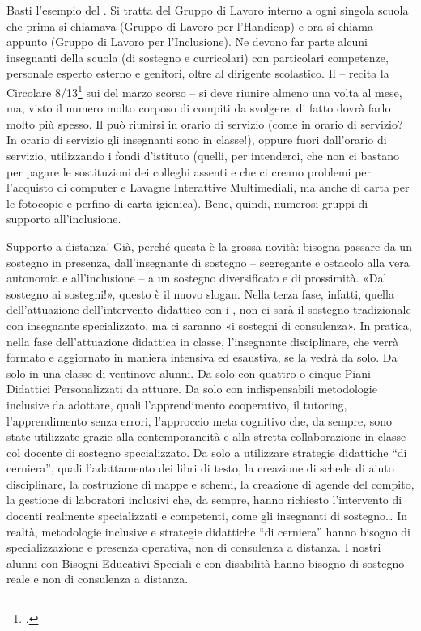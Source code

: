 Basti l'esempio del . Si tratta del Gruppo di Lavoro interno a ogni singola scuola che prima si chiamava  (Gruppo di Lavoro per l'Handicap) e ora si chiama appunto  (Gruppo di Lavoro per l'Inclusione). Ne devono far parte alcuni insegnanti della scuola (di sostegno e curricolari) con particolari competenze, personale esperto esterno e genitori, oltre al dirigente scolastico. Il  – recita la Circolare 8/13\footcite{cm8_2013} sui  del marzo scorso – si deve riunire almeno una volta al mese, ma, visto il numero molto corposo di compiti da svolgere, di fatto dovrà farlo molto più spesso. Il  può riunirsi in orario di servizio (come in orario di servizio? In orario di servizio gli insegnanti sono in classe!), oppure fuori dall'orario di servizio, utilizzando i fondi d'istituto (quelli, per intenderci, che non ci bastano per pagare le sostituzioni dei colleghi assenti e che ci creano problemi per l'acquisto di computer e Lavagne Interattive Multimediali, ma anche di carta per le fotocopie e perfino di carta igienica). Bene, quindi, numerosi gruppi di supporto all'inclusione.

Supporto a distanza! Già, perché questa è la grossa novità: bisogna passare da un sostegno in presenza, dall'insegnante di sostegno – segregante e ostacolo alla vera autonomia e all'inclusione – a un sostegno diversificato e di prossimità. «Dal sostegno ai sostegni!», questo è il nuovo slogan. Nella terza fase, infatti, quella dell'attuazione dell'intervento didattico con i , non ci sarà il sostegno tradizionale con insegnante specializzato, ma ci saranno «i sostegni di consulenza». In pratica, nella fase dell'attuazione didattica in classe, l'insegnante disciplinare, che verrà formato e aggiornato in maniera intensiva ed esaustiva, se la vedrà da solo. Da solo in una classe di ventinove alunni. Da solo con quattro o cinque Piani Didattici Personalizzati da attuare. Da solo con indispensabili metodologie inclusive da adottare, quali l'apprendimento cooperativo, il tutoring, l'apprendimento senza errori, l'approccio meta cognitivo che, da sempre, sono state utilizzate grazie alla contemporaneità e alla stretta collaborazione in classe col docente di sostegno specializzato. Da solo a utilizzare strategie didattiche “di cerniera”, quali l'adattamento dei libri di testo, la creazione di schede di aiuto disciplinare, la costruzione di mappe e schemi, la creazione di agende del compito, la gestione di laboratori inclusivi che, da sempre, hanno richiesto l'intervento di docenti realmente specializzati e competenti, come gli insegnanti di sostegno\dots
In realtà, metodologie inclusive e strategie didattiche “di cerniera” hanno bisogno di specializzazione e presenza operativa, non di consulenza a distanza. I nostri alunni con Bisogni Educativi Speciali e con disabilità hanno bisogno di sostegno reale e non di consulenza a distanza.

